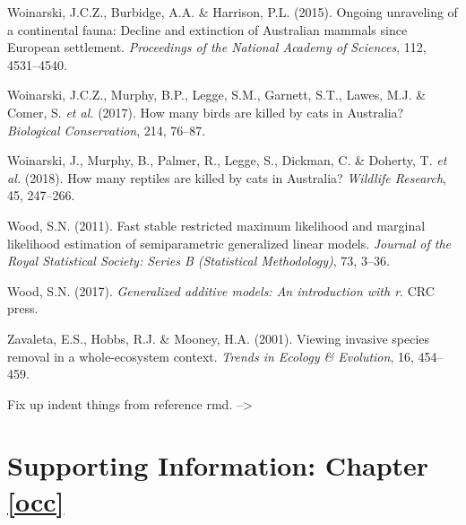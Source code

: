 \documentclass[11pt,a4paper,titlepage,twoside,openright]{style/unimelbthesis}
\begin{document}
\begin{mainmatter}
\leavevmode\hypertarget{ref-woinarski2015ongoing}{}%
Woinarski, J.C.Z., Burbidge, A.A. \& Harrison, P.L. (2015). Ongoing unraveling of a continental fauna: Decline and extinction of Australian mammals since European settlement. \emph{Proceedings of the National Academy of Sciences}, 112, 4531--4540.

\leavevmode\hypertarget{ref-woinarski2017birds}{}%
Woinarski, J.C.Z., Murphy, B.P., Legge, S.M., Garnett, S.T., Lawes, M.J. \& Comer, S. \emph{et al.} (2017). How many birds are killed by cats in Australia? \emph{Biological Conservation}, 214, 76--87.

\leavevmode\hypertarget{ref-woinarski2018reptiles}{}%
Woinarski, J., Murphy, B., Palmer, R., Legge, S., Dickman, C. \& Doherty, T. \emph{et al.} (2018). How many reptiles are killed by cats in Australia? \emph{Wildlife Research}, 45, 247--266.

\leavevmode\hypertarget{ref-wood2011fast}{}%
Wood, S.N. (2011). Fast stable restricted maximum likelihood and marginal likelihood estimation of semiparametric generalized linear models. \emph{Journal of the Royal Statistical Society: Series B (Statistical Methodology)}, 73, 3--36.

\leavevmode\hypertarget{ref-wood2017generalized}{}%
Wood, S.N. (2017). \emph{Generalized additive models: An introduction with r}. CRC press.

\leavevmode\hypertarget{ref-zavaleta2001viewing}{}%
Zavaleta, E.S., Hobbs, R.J. \& Mooney, H.A. (2001). Viewing invasive species removal in a whole-ecosystem context. \emph{Trends in Ecology \& Evolution}, 16, 454--459.

\appendix

Fix up indent things from reference rmd.
--\textgreater{}
\setlength{\parindent}{0in}
\setlength{\leftskip}{0in}
\setlength{\parskip}{8pt}

\hypertarget{occ-app}{%
\chapter{Supporting Information: Chapter \ref{occ}}\label{occ-app}}

\newpage

\(~\)

\(~\)

\(~\)


\end{mainmatter}
\end{document}
